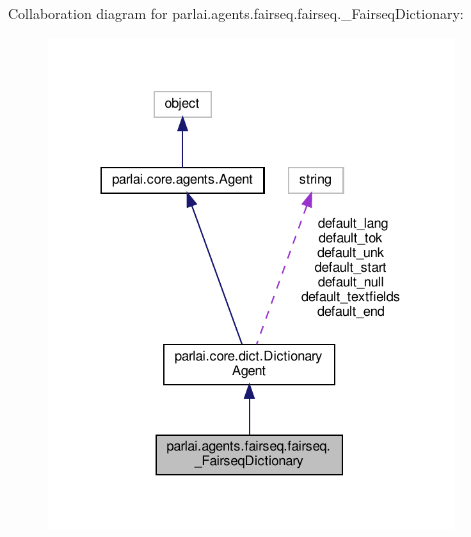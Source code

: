 Collaboration diagram for parlai.\+agents.\+fairseq.\+fairseq.\+\_\+\+Fairseq\+Dictionary\+:
\nopagebreak
\begin{figure}[H]
\begin{center}
\leavevmode
\includegraphics[width=305pt]{classparlai_1_1agents_1_1fairseq_1_1fairseq_1_1__FairseqDictionary__coll__graph}
\end{center}
\end{figure}
